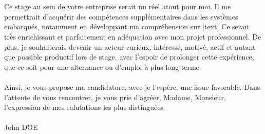 \documentclass[a4paper,11pt]{article}
\begin{document}
\\\\
Ce stage au sein de votre entreprise serait un réel atout pour moi. Il me permettrait d’acquérir des compétences supplémentaires dans les systèmes embarqués, notamment en développant ma compréhension sur [text] Ce serait très enrichissant et parfaitement en adéquation avec mon projet professionnel. De plus, je souhaiterais devenir un acteur curieux, intéressé, motivé, actif et autant que possible productif lors de stage, avec l’espoir de prolonger cette expérience, que ce soit pour une alternance ou d’emploi à plus long terme.
\\\\
Ainsi, je vous propose ma candidature, avec je l’espère, une issue favorable.
Dans l'attente de vous rencontrer, je vous prie d'agréer, Madame, Monsieur, l'expression de mes salutations les plus distinguées.
\\\\
John DOE
\end{document}
